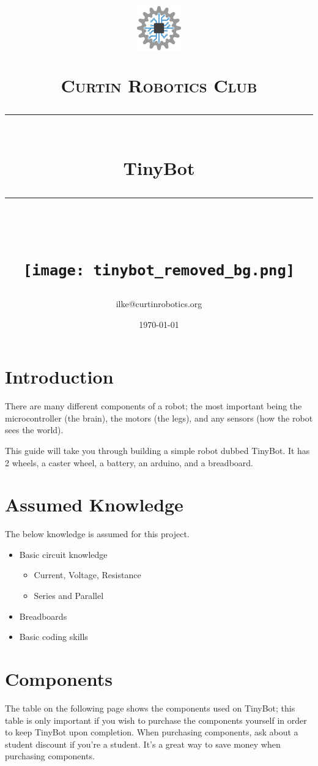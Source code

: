 \documentclass[a4paper,12pt]{article}
\title{	
    \begin{center}
        \includegraphics[width=0.15\textwidth]{CRoCLogo(mediumquality).png}
    \end{center}
	\normalfont\normalsize
	\textsc{Curtin Robotics Club}\\ %
	\vspace{25pt} %
	\rule{\linewidth}{0.5pt}\\ %
	\vspace{20pt} %
    {\huge TinyBot }\\
	\vspace{12pt} %
	\rule{\linewidth}{2pt}\\ %
	\vspace{12pt} %
  \begin{center}
    \texttt{[image: tinybot\_removed\_bg.png]}
  \end{center}
}
\author{\small ilke@curtinrobotics.org} %
\date{\normalsize\today} %
\begin{document}
\maketitle

\pagebreak
{}
\tableofcontents

\pagebreak
{}

\section{Introduction}

There are many different components of a robot; the most important being the microcontroller (the brain), the motors (the legs), and any sensors (how the robot sees the world).

This guide will take you through building a simple robot dubbed TinyBot. It has 2 wheels, a caster wheel, a battery, an arduino, and a breadboard.

\section{Assumed Knowledge}

The below knowledge is assumed for this project. 

\begin{itemize}
    \item Basic circuit knowledge
    \begin{itemize}
        \item Current, Voltage, Resistance
        \item Series and Parallel
    \end{itemize}
    \item Breadboards
    \item Basic coding skills
\end{itemize}

\section{Components}\label{sec:components}
 
The table on the following page shows the components used on TinyBot; this table is only important if you wish to purchase the components yourself in order to keep TinyBot upon completion. When purchasing components, ask about a student discount if you're a student. It's a great way to save money when purchasing components. \\
\end{document}
